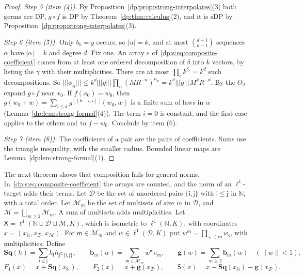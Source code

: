 \documentclass[11pt]{amsart}
\theoremstyle{definition}
\theoremstyle{remark}
\numberwithin{equation}{section}
\newcommand{\N}{\mathbb N}
\newcommand{\abs}[1]{\lvert #1\rvert}
\newcommand{\norm}[1]{\lVert #1\rVert}
\theoremstyle{plain}
\theoremstyle{definition}
\theoremstyle{plain}
\begin{document}
\begin{proof}
\emph{Step 5 (item (4)).} By Proposition~\ref{dp:prop:strong-interpolates}(3) both germs are DP, $g\circ f$ is DP by Theorem~\ref{dp:thm:calculus}(2), and it is sDP by Proposition~\ref{dp:prop:strong-interpolates}(3).

\emph{Step 6 (item (5)).} Only $b_k=g$ occurs, so $\abs\alpha=k$, and at most $\binom{d-1}{k-1}$ sequences $\alpha$ have $\abs\alpha=k$ and degree $d$. Fix one. An array $\varepsilon$ of~\eqref{dp:s:eq:composite-coefficient} comes from at least one ordered decomposition of $\delta$ into $k$ vectors, by listing the $\gamma$ with their multiplicities. There are at most $\prod_ck^{\delta_c}=k^d$ such decompositions. So $\lvert\!\lvert\!\lvert \phi_\alpha\rvert\!\rvert\!\rvert\le k^d\lvert\!\lvert\!\lvert g\rvert\!\rvert\!\rvert\prod_n(MR^{-n})^{\alpha_n}=k^d\lvert\!\lvert\!\lvert g\rvert\!\rvert\!\rvert M^kR^{-d}$. By \cite[Lemma~Q.3]{I} the $\Theta_d$ expand $g\circ f$ near $x_0$. If $f(x_0)=w_0$, then $g(w_0+w)=\sum_{i\le k}g^{[(k-i,i)]}(w_0,w)$ is a finite sum of laws in $w$ (Lemma~\ref{dp:lem:strong-formal}(4)). The term $i=0$ is constant, and the first case applies to the others and to $f-w_0$. Conclude by item (6).

\emph{Step 7 (item (6)).} The coefficients of a pair are the pairs of coefficients. Sums use the triangle inequality, with the smaller radius. Bounded linear maps are Lemma~\ref{dp:lem:strong-formal}(1).
\end{proof}

The next theorem shows that composition fails for general norms. In~\eqref{dp:s:eq:composite-coefficient} the arrays are counted, and the norm of an $\ell^1$-target adds their terms. Let $\mathcal D$ be the set of unordered pairs $\{\mathsf i,\mathsf j\}$ with $\mathsf i\le\mathsf j$ in $\N$, with a total order. Let $\mathcal M_m$ be the set of multisets of size $m$ in $\mathcal D$, and $\mathcal M=\bigsqcup_{m\ge2}\mathcal M_m$. A sum of multisets adds multiplicities. Let $\mathsf X=\ell^1(\N\sqcup\mathcal D\sqcup\mathcal M,K)$, which is isometric to $\ell^1(\N,K)$, with coordinates $x=(x_\N,x_{\mathcal D},x_{\mathcal M})$. For $\mathsf m\in\mathcal M_m$ and $w\in\ell^1(\mathcal D,K)$ put $w^{\mathsf m}=\prod_{\varsigma\in\mathsf m}w_\varsigma$, with multiplicities. Define
\[
 \mathbf{Sq}(h)=\sum_{\mathsf i\le\mathsf j}h_{\mathsf i}h_{\mathsf j}e_{\{\mathsf i,\mathsf j\}},\qquad\mathbf b_m(w)=\sum_{\mathsf m\in\mathcal M_m}w^{\mathsf m}e_{\mathsf m},\qquad\mathbf g(w)=\sum_{m\ge2}\mathbf b_m(w)\quad(\norm w<1),
\]
\[
 F_1(x)=x+\mathbf{Sq}(x_\N),\qquad F_2(x)=x+\mathbf g(x_{\mathcal D}),\qquad\mathsf S(x)=x-\mathbf{Sq}(x_\N)-\mathbf g(x_{\mathcal D}).
\]
\end{document}
